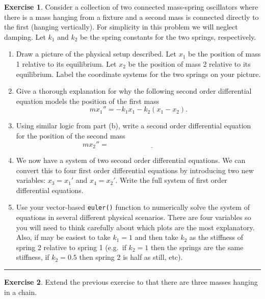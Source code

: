 \documentclass[
]{book}
\providecommand{\tightlist}{%
  \setlength{\itemsep}{0pt}\setlength{\parskip}{0pt}}
\theoremstyle{definition}
\theoremstyle{definition}
\theoremstyle{definition}
\newtheorem{exercise}{Exercise}[chapter]
\theoremstyle{remark}
\begin{document}
\begin{exercise}
\protect\hypertarget{exr:unnamed-chunk-434}{}{\label{exr:unnamed-chunk-434} }Consider a collection of two connected mass-spring oscillators where there is a mass hanging from a fixture and a second mass is connected directly to the first (hanging vertically). For simplicity in this problem we will neglect damping. Let \(k_1\) and \(k_2\) be the spring constants for the two springs, respectively.

\begin{enumerate}
\def\labelenumi{\alph{enumi}.}
\tightlist
\item
  Draw a picture of the physical setup described. Let \(x_1\) be the position of mass 1 relative to its equilibrium. Let \(x_2\) be the position of mass 2 relative to its equilibrium. Label the coordinate systems for the two springs on your picture.
\item
  Give a thorough explanation for why the following second order differential equation models the position of the first mass
  \[ m x_1'' = -k_1 x_1 - k_2 (x_1 - x_2).  \]
\item
  Using similar logic from part (b), write a second order differential equation for the position of the second mass
  \[ m x_2'' = \underline{\hspace{2in}} \]
\item
  We now have a system of two second order differential equations. We can convert this to four first order differential equations by introducing two new variables: \(x_3 = x_1'\) and \(x_4 = x_2'\). Write the full system of first order differential equations.
\item
  Use your vector-based \texttt{euler()} function to numerically solve the system of equations in several different physical scenarios. There are four variables so you will need to think carefully about which plots are the most explanatory. Also, if may be easiest to take \(k_1 = 1\) and then take \(k_2\) as the stiffness of spring 2 relative to spring 1 (e.g.~if \(k_2 = 1\) then the springs are the same stiffness, if \(k_2 = 0.5\) then spring 2 is half as still, etc).
\end{enumerate}
\end{exercise}

\begin{center}\rule{0.5\linewidth}{0.5pt}\end{center}

\begin{exercise}
\protect\hypertarget{exr:unnamed-chunk-435}{}{\label{exr:unnamed-chunk-435} }Extend the previous exercise to that there are three masses hanging in a chain.
\end{exercise}
\end{document}
